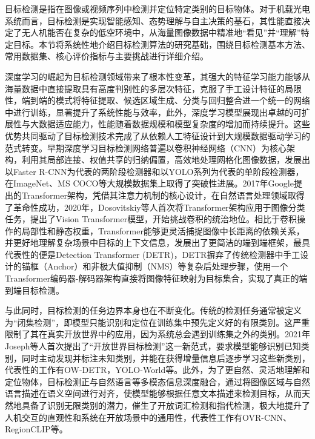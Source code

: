 目标检测是指在图像或视频序列中检测并定位特定类别的目标物体。对于机载光电系统而言，目标检测是实现智能感知、态势理解与自主决策的基石，其性能直接决定了无人机能否在复杂的低空环境中，从海量图像数据中精准地“看见”并“理解”特定目标。本节将系统性地介绍目标检测算法的研究基础，围绕目标检测基本方法、常用数据集、核心评价指标与主要挑战进行详细介绍。


深度学习的崛起为目标检测领域带来了根本性变革，其强大的特征学习能力能够从海量数据中直接提取具有高度判别性的多层次特征，克服了手工设计特征的局限性，端到端的模式将特征提取、候选区域生成、分类与回归整合进一个统一的网络中进行训练，显著提升了系统性能与效率，此外，深度学习模型展现出卓越的可扩展性与大数据适应能力，性能随着数据规模和模型复杂度的增加而持续提升。这些优势共同驱动了目标检测技术完成了从依赖人工特征设计到大规模数据驱动学习的范式转变。早期深度学习目标检测网络普遍以卷积神经网络（CNN）为核心架构，利用其局部连接、权值共享的归纳偏置，高效地处理网格化图像数据，发展出以Faster R-CNN\cite{Ren2017FasterRCNN}为代表的两阶段检测器和以YOLO\cite{redmon2016lookonceunifiedrealtime}系列为代表的单阶段检测器，在ImageNet\cite{Deng2009ImageNet}、MS COCO\cite{Lin2014COCO}等大规模数据集上取得了突破性进展。2017年Google提出的Transformer架构，凭借其注意力机制的核心设计，在自然语言处理领域取得了革命性成功，2020年，Dosovitskiy等人首次将Transformer架构应用于图像分类任务，提出了Vision Transformer\cite{Dosovitskiy2020ViT}模型，开始挑战卷积的统治地位。相比于卷积操作的局部性和静态权重，Transformer能够更灵活捕捉图像中长距离的依赖关系，并更好地理解复杂场景中目标的上下文信息，发展出了更简洁的端到端框架，最具代表性的便是Detection Transformer\cite{Carion2020DETR} (DETR)，DETR摒弃了传统检测器中手工设计的锚框（Anchor）和非极大值抑制（NMS）等复杂后处理步骤，使用一个Transformer编码器-解码器架构直接将图像特征映射为目标集合，实现了真正的端到端目标检测。

与此同时，目标检测的任务边界本身也在不断变化\cite{JSJC202506036}。传统的检测任务通常被定义为“闭集检测”，即模型只能识别和定位在训练集中预先定义好的有限类别。这严重限制了其在真实开放世界中的应用，因为系统总会遇到训练集之外的类别。2021年Joseph等人\cite{Joseph2021OWOD}首次提出了“开放世界目标检测”这一新范式，要求模型能够识别已知类别，同时主动发现并标注未知类别，并能在获得增量信息后逐步学习这些新类别，代表性的工作有OW-DETR\cite{gupta2021ow}，YOLO-World\cite{Cheng2024YOLOWorld}等。此外，为了更自然、灵活地理解和定位物体，目标检测正与自然语言等多模态信息深度融合，通过将图像区域与自然语言描述在语义空间进行对齐，使模型能够根据任意文本描述来检测目标，从而天然地具备了识别无限类别的潜力，催生了开放词汇检测和指代检测，极大地提升了人机交互的直观性和系统在开放场景中的通用性，代表性工作有OVR-CNN\cite{Zareian_2021_CVPR}、RegionCLIP\cite{zhong2022regionclip}等。

